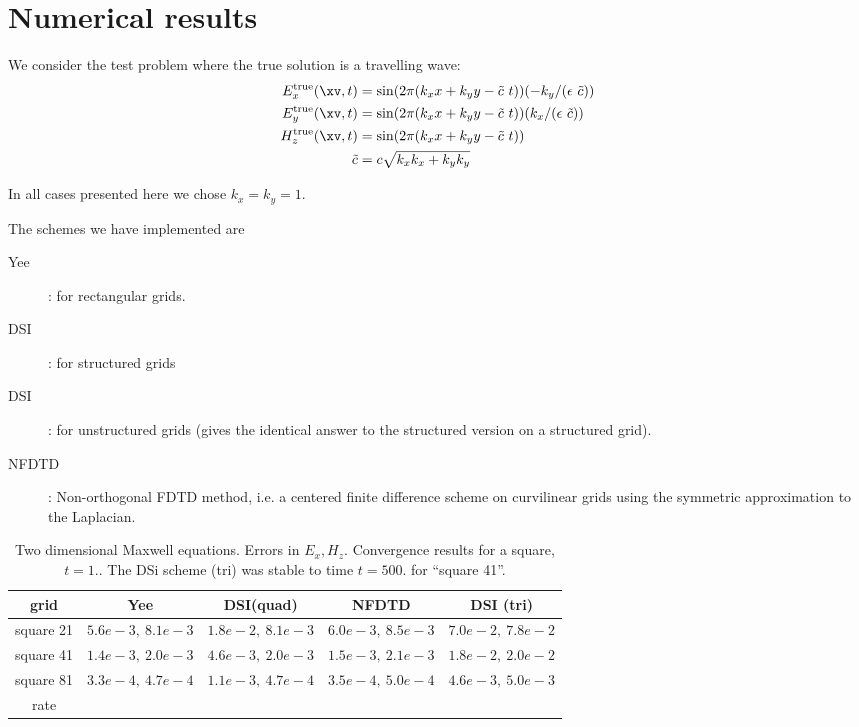 \documentclass[10pt]{article}
\begin{document}
\section{Numerical results}

We consider the test problem where the true solution is a travelling wave:
\begin{align*}
 E_x^{\rm true}(\xv,t) &= \sin(2\pi (k_x  x +k_y y -\cc~t )) (-k_y/(\epsilon~\cc)) \\
 E_y^{\rm true}(\xv,t) &= \sin(2\pi (k_x  x +k_y y -\cc~t )) ( k_x/(\epsilon~\cc))  \\
 H_z^{\rm true}(\xv,t) &= \sin(2\pi (k_x  x +k_y y -\cc~t ))   \\
\cc &= c \sqrt{ k_x k_x+k_y k_y }
\end{align*}

In all cases presented here we chose $k_x=k_y=1$.


The schemes we have implemented are
\begin{description}
  \item[Yee] : for rectangular grids.
  \item[DSI] : for structured grids
  \item[DSI] : for unstructured grids (gives the identical answer to the structured version on a structured grid).
  \item[NFDTD] : Non-orthogonal FDTD method, i.e. a centered finite difference scheme on curvilinear grids
     using the symmetric approximation to the Laplacian.
\end{description}


\begin{table}[hbt]
\begin{center}
\begin{tabular}{|c|c|c|c|c|} \hline 
  grid         & Yee                 &   DSI(quad)         & NFDTD              &   DSI (tri)       \\   \hline\hline 
  square 21    & $5.6e-3,~8.1e-3$  & $1.8e-2,~8.1e-3$  & $6.0e-3,~8.5e-3$ & $7.0e-2,~7.8e-2$  \\ 
  square 41    & $1.4e-3,~2.0e-3$  & $4.6e-3,~2.0e-3$  & $1.5e-3,~2.1e-3$ & $1.8e-2,~2.0e-2$  \\ 
  square 81    & $3.3e-4,~4.7e-4$  & $1.1e-3,~4.7e-4$  & $3.5e-4,~5.0e-4$ & $4.6e-3,~5.0e-3$         \\ 
   rate        &                     &                     &                    &                    \\ \hline
\end{tabular}
\end{center}
\caption{Two dimensional Maxwell equations. Errors in $E_x, H_z$. Convergence results for a square, $t=1.$.
   The DSi scheme (tri) was stable to time $t=500.$ for ``square 41''.}
 \label{tab:conv square} 
\end{table}
\end{document}
